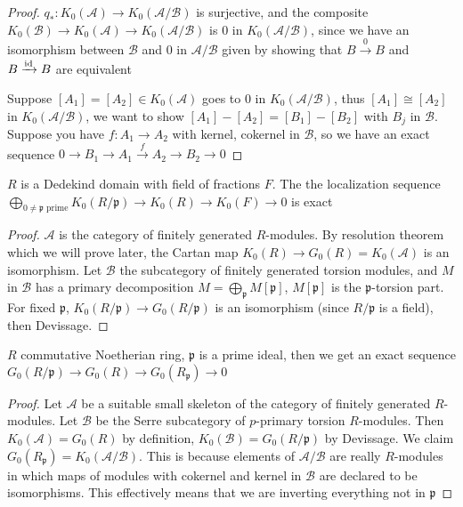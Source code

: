 \documentclass[main]{subfiles}
\begin{document}
\begin{proof}
$q_*:K_0(\mathscr A)\to K_0(\mathscr A/\mathscr B)$ is surjective, and the composite $K_0(\mathscr B)\to K_0(\mathscr A)\to K_0(\mathscr A/\mathscr B)$ is 0 in $K_0(\mathscr A/\mathscr B)$, since we have an isomorphism between $\mathscr B$ and 0 in $\mathscr A/\mathscr B$ given by showing that $B\xrightarrow0B$ and $B\xrightarrow{\operatorname{id}} B$ are equivalent

Suppose $[A_1]=[A_2]\in K_0(\mathscr A)$ goes to 0 in $K_0(\mathscr A/\mathscr B)$, thus $[A_1]\cong [A_2]$ in $K_0(\mathscr A/\mathscr B)$, we want to show $[A_1]-[A_2]=[B_1]-[B_2]$ with $B_j$ in $\mathscr B$. Suppose you have $f:A_1\to A_2$ with kernel, cokernel in $\mathscr B$, so we have an exact sequence $0\to B_1\to A_1\xrightarrow{f}A_2\to B_2\to 0$
\end{proof}

\begin{corollary}
$R$ is a Dedekind domain with field of fractions $F$. The the localization sequence $\displaystyle\bigoplus_{0\neq\mathfrak p\text{ prime}}K_0(R/\mathfrak p)\to K_0(R)\to K_0(F)\to0$ is exact
\end{corollary}

\begin{proof}
$\mathscr A$ is the category of finitely generated $R$-modules. By resolution theorem which we will prove later, the Cartan map $K_0(R)\to G_0(R)=K_0(\mathscr A)$ is an isomorphism. Let $\mathscr B$ the subcategory of finitely generated torsion modules, and $M$ in $\mathscr B$ has a primary decomposition $\displaystyle M=\bigoplus_{\mathfrak p}M[\mathfrak p]$, $M[\mathfrak p]$ is the $\mathfrak p$-torsion part. For fixed $\mathfrak p$, $K_0(R/\mathfrak p)\to G_0(R/\mathfrak p)$ is an isomorphism (since $R/\mathfrak p$ is a field), then Devissage.
\end{proof}

\begin{proposition}
$R$ commutative Noetherian ring, $\mathfrak p$ is a prime ideal, then we get an exact sequence $G_0(R/\mathfrak p)\to G_0(R)\to G_0(R_{\mathfrak p})\to 0$
\end{proposition}

\begin{proof}
Let $\mathscr A$ be a suitable small skeleton of the category of finitely generated $R$-modules. Let $\mathscr B$ be the Serre subcategory of $p$-primary torsion $R$-modules. Then $K_0(\mathscr A)=G_0(R)$ by definition, $K_0(\mathscr B)=G_0(R/\mathfrak p)$ by Devissage. We claim $G_0(R_{\mathfrak p})=K_0(\mathscr A/\mathscr B)$. This is because elements of $\mathscr A/\mathscr B$ are really $R$-modules in which maps of modules with cokernel and kernel in $\mathscr B$ are declared to be isomorphisms. This effectively means that we are inverting everything not in $\mathfrak p$
\end{proof}
\end{document}
